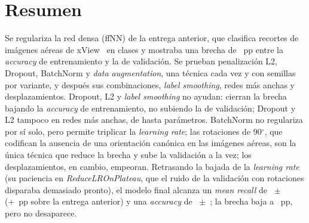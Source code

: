 \section*{Resumen}
Se regulariza la red densa (ffNN) de la entrega anterior, que clasifica recortes de imágenes aéreas de
xView~\cite{xview} en  clases y mostraba una brecha de ~pp entre la \emph{accuracy}
de entrenamiento y la de validación. Se prueban penalización L2, Dropout, BatchNorm y \emph{data augmentation}, una
técnica cada vez y con  semillas por variante, y después sus combinaciones, \emph{label smoothing},
redes más anchas y desplazamientos. Dropout, L2 y \emph{label smoothing} no ayudan: cierran la brecha bajando la
\emph{accuracy} de entrenamiento, no subiendo la de validación; Dropout y L2 tampoco en redes más anchas, de hasta
 parámetros. BatchNorm no regulariza
por sí solo, pero permite triplicar la \emph{learning rate}; las rotaciones de 90$^\circ$, que codifican la ausencia
de una orientación canónica en las imágenes aéreas, son la única técnica que reduce la brecha y sube la validación a
la vez; los desplazamientos, en cambio, empeoran. Retrasando la bajada de la \emph{learning rate} (su paciencia en \emph{ReduceLROnPlateau}, que el ruido de la validación con rotaciones disparaba demasiado pronto), el modelo final alcanza un \emph{mean recall} de
~$\pm$~ (+~pp sobre la entrega anterior) y una
\emph{accuracy} de ~$\pm$~; la brecha baja a ~pp, pero no
desaparece.
